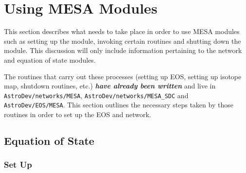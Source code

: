 \section{Using {\sf MESA} Modules}
\label{sec:using_modules}

This section describes what needs to take place in order to use 
{\sf MESA} modules such as setting up the module, invoking certain routines 
and shutting down the module. This discussion will only include information 
pertaining to the network and equation of state modules.

The routines that carry out these processes (setting up EOS, setting up 
isotope map, shutdown routines, etc.) {\bf \emph{have already been written}} 
and live in {\tt AstroDev/networks/MESA}, {\tt AstroDev/networks/MESA\_SDC} 
and {\tt AstroDev/EOS/MESA}. This section 
outlines the necessary steps taken by those routines in order to set up the 
EOS and network. 

 
\subsection{Equation of State}

\subsubsection{Set Up}

